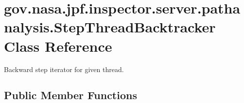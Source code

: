 \hypertarget{classgov_1_1nasa_1_1jpf_1_1inspector_1_1server_1_1pathanalysis_1_1_step_thread_backtracker}{}\section{gov.\+nasa.\+jpf.\+inspector.\+server.\+pathanalysis.\+Step\+Thread\+Backtracker Class Reference}
\label{classgov_1_1nasa_1_1jpf_1_1inspector_1_1server_1_1pathanalysis_1_1_step_thread_backtracker}


Backward step iterator for given thread.  


\subsection*{Public Member Functions}
